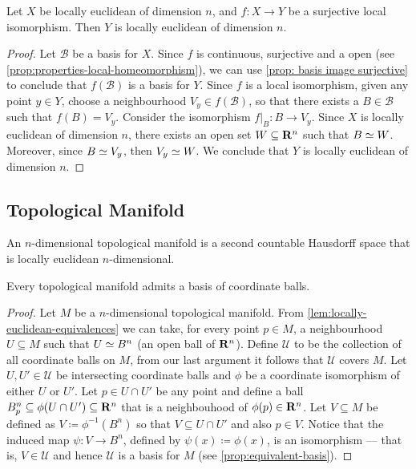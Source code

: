 \begin{proposition}
\label{prop:locally-euclidean-from-surjective-map}
Let \(X\) be locally euclidean of dimension \(n\), and \(f: X \to Y\) be a
surjective local isomorphism. Then \(Y\) is locally euclidean of dimension
\(n\).
\end{proposition}

\begin{proof}
Let \(\mathcal B\) be a basis for \(X\). Since \(f\) is continuous, surjective
and a open (see \cref{prop:properties-local-homeomorphism}), we can use
\cref{prop: basis image surjective} to conclude that \(f(\mathcal B)\) is a
basis for \(Y\). Since \(f\) is a local isomorphism, given any point \(y \in
Y\), choose a neighbourhood \(V_y \in f(\mathcal B)\), so that there exists a
\(B \in \mathcal B\) such that \(f(B) = V_y\). Consider the isomorphism
\(f|_B: B \to V_y\). Since \(X\) is locally euclidean of dimension \(n\), there
exists an open set \(W \subseteq \mathbf{R}^n\) such that \(B \simeq W\). Moreover, since
\(B \simeq V_y\), then \(V_y \simeq W\). We conclude that \(Y\) is locally euclidean
of dimension \(n\).
\end{proof}

\subsection{Topological Manifold}

\begin{definition}\label{def: topological manifold}
An \(n\)-dimensional topological manifold is a second countable Hausdorff
space that is locally euclidean \(n\)-dimensional.
\end{definition}

\begin{proposition}\label{prop:coordinate-ball-basis}
Every topological manifold admits a basis of coordinate balls.
\end{proposition}

\begin{proof}
Let \(M\) be a \(n\)-dimensional topological manifold. From
\cref{lem:locally-euclidean-equivalences} we can take, for every point \(p \in
M\), a neighbourhood \(U \subseteq M\) such that \(U \simeq B^n\) (an open ball of
\(\mathbf{R}^n\)). Define \(\mathcal{U}\) to be the collection of all coordinate balls
on \(M\), from our last argument it follows that \(\mathcal U\) covers
\(M\). Let \(U, U' \in \mathcal U\) be intersecting coordinate balls and
\(\phi\) be a coordinate isomorphism of either \(U\) or \(U'\). Let \(p \in U
\cap U'\) be any point and define a ball \(B_{p}^{n} \subseteq \phi(U
\cap U') \subseteq \mathbf{R}^n\) that is a neighbouhood of \(\phi(p) \in \mathbf{R}^n\).
Let \(V \subseteq M\) be defined as \(V \coloneq \phi^{-1}(B^n)\) so that \(V
\subseteq U \cap U'\) and also \(p \in V\). Notice that the induced map \(\psi:
V \to B^n\), defined by \(\psi(x) \coloneq \phi(x)\), is an isomorphism --- that
is, \(V \in \mathcal U\) and hence \(\mathcal U\) is a basis for \(M\) (see
\cref{prop:equivalent-basis}).
\end{proof}

